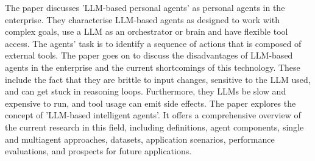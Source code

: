 \documentclass{article}
\begin{document}

The paper \cite{muthusamy_towards_2023} discusses 'LLM-based personal agents' as personal agents in the enterprise. They characterise LLM-based agents as designed to work with complex goals, use a LLM as an orchestrator or brain and have flexible tool access. The agents' task is to identify a sequence of actions that is composed of external tools. The paper goes on to discuss the disadvantages of LLM-based agents in the enterprise and the current shortcomings of this technology. These include the fact that they are brittle to input changes, sensitive to the LLM used, and can get stuck in reasoning loops. Furthermore, they LLMs be slow and expensive to run, and tool usage can emit side effects. 
The paper \cite{cheng_exploring_2024} explores the concept of 'LLM-based intelligent agents'. It offers a comprehensive overview of the current research in this field, including definitions, agent components, single and multiagent approaches, datasets, application scenarios, performance evaluations, and prospects for future applications. 
\end{document}
